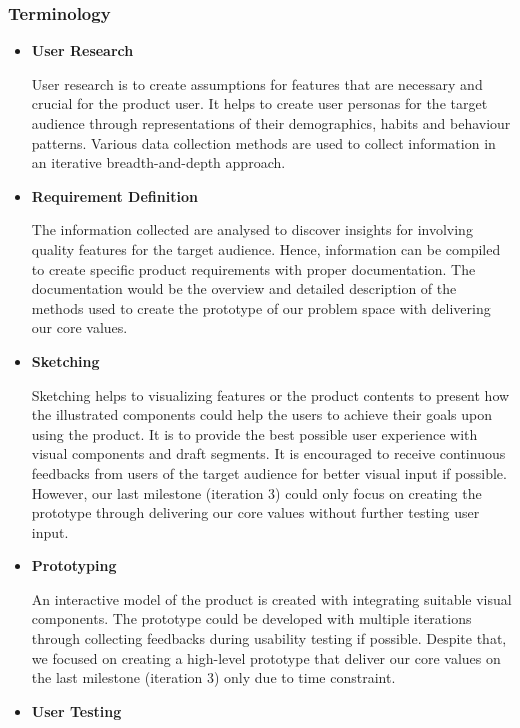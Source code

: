     \subsubsection{Terminology}
      \begin{itemize}
        \item \textbf{User Research}
          \par User research is to create assumptions for features that are necessary and crucial for the product user. It helps to create user personas for the target audience through representations of their demographics, habits and behaviour patterns. Various data collection methods are used to collect information in an iterative breadth-and-depth approach.
        \item \textbf{Requirement Definition}
          \par The information collected are analysed to discover insights for involving quality features for the target
          audience. Hence, information can be compiled to create specific product requirements with proper
          documentation. The documentation would be the overview and detailed description of the methods
          used to create the prototype of our problem space with delivering our core values.
        \item \textbf{Sketching}
          \par Sketching helps to visualizing features or the product contents to present how the illustrated
          components could help the users to achieve their goals upon using the product. It is to provide the
          best possible user experience with visual components and draft segments. It is encouraged to receive
          continuous feedbacks from users of the target audience for better visual input if possible. However,
          our last milestone (iteration 3) could only focus on creating the prototype through delivering our core
          values without further testing user input.
        \item \textbf{Prototyping}
          \par An interactive model of the product is created with integrating suitable visual components. The
          prototype could be developed with multiple iterations through collecting feedbacks during usability
          testing if possible. Despite that, we focused on creating a high-level prototype that deliver our core
          values on the last milestone (iteration 3) only due to time constraint.
        \item \textbf{User Testing}

\end{itemize}
